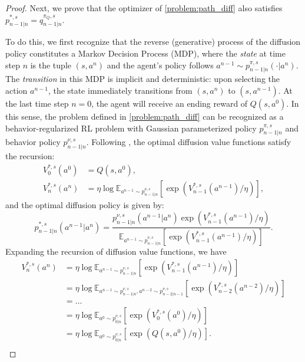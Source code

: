 \begin{proof}
Next, we prove that the optimizer of \eqref{problem:path_diff} also satisfies $p^{*, s}_{n-1|n}=q^{\pi_Q, s}_{n-1|n}$. 

To do this, we first recognize that the reverse (generative) process of the diffusion policy constitutes a Markov Decision Process (MDP), where the \textit{state} at time step $n$ is the tuple $(s, a^n)$ and the agent's policy follows $a^{n-1}\sim p^{\pi, s}_{n-1|n}(\cdot|a^n)$. The \textit{transition} in this MDP is implicit and deterministic: upon selecting the action $a^{n-1}$, the state immediately transitions from $(s, a^n)$ to $(s, a^{n-1})$. At the last time step $n=0$, the agent will receive an ending reward of $Q(s, a^0)$. In this sense, the problem defined in \eqref{problem:path_diff} can be recognized as a behavior-regularized RL problem with Gaussian parameterized policy $p^{\pi,s}_{n-1|n}$ and behavior policy $p^{\nu,s}_{n-1|n}$. Following \citet{brac}, the optimal diffusion value functions satisfy the recursion:
\begin{equation}\label{appeq:diffusion_value_recursion}
        \begin{aligned}
        V_0^{*, s}(a^0)&=Q(s, a^0),\\
        V_n^{*, s}(a^n)&=\eta\log\mathbb{E}_{a^{n-1}\sim p^{\nu,s}_{n-1|n}}\left[\exp(V^{*, s}_{n-1}(a^{n-1})/\eta)\right],
    \end{aligned}
\end{equation}
and the optimal diffusion policy is given by:
\begin{equation}\label{appeq:optimal_diffusion_policy}
    p^{*, s}_{n-1|n}(a^{n-1}|a^n)=\frac{p^{\nu,s}_{n-1|n}(a^{n-1}|a^n)\exp(V^{*, s}_{n-1}(a^{n-1})/\eta)}{\mathbb{E}_{a^{n-1}\sim p^{\nu,s}_{n-1|n}}\left[\exp(V^{*, s}_{n-1}(a^{n-1})/\eta)\right]}.
\end{equation}
Expanding the recursion of diffusion value functions, we have
\begin{equation}
    \begin{aligned}
    V^{*, s}_n(a^n)&=\eta\log\mathbb{E}_{a^{n-1}\sim p^{\nu,s}_{n-1|n}}\left[\exp(V^{*, s}_{n-1}(a^{n-1})/\eta)\right]\\
    &=\eta\log\mathbb{E}_{a^{n-1}\sim p^{\nu,s}_{n-1|n},a^{n-2}\sim p^{\nu,s}_{n-2|n-1}}\left[\exp(V^{*, s}_{n-2}(a^{n-2})/\eta)\right]\\
    &=\ldots\\
    &=\eta\log\mathbb{E}_{a^{0}\sim p^{\nu,s}_{0|n}}\left[\exp(V^{*, s}_{0}(a^{0})/\eta)\right]\\
    &=\eta\log\mathbb{E}_{a^{0}\sim p^{\nu,s}_{0|n}}\left[\exp(Q(s, a^{0})/\eta)\right].\\

\end{aligned}
\end{equation}
\end{proof}
